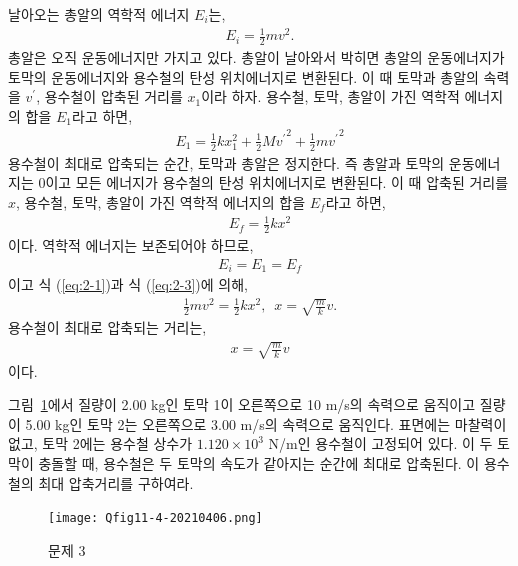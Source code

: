 \documentclass[floatfix,nofootinbib,superscriptaddress,fleqn]{revtex4-2}
\begin{document}
날아오는 총알의 역학적 에너지 $E_i$는,
\begin{align}\label{eq:2-1}
  E_i = \frac{1}{2}mv^2.
\end{align}
총알은 오직 운동에너지만 가지고 있다. 총알이 날아와서 박히면 총알의 
운동에너지가 토막의 운동에너지와 용수철의 탄성 위치에너지로 변환된다.
이 때 토막과 총알의 속력을 $v^\prime$, 용수철이 압축된 거리를 $x_1$이라 하자.
용수철, 토막, 총알이 가진 역학적 에너지의 합을 $E_1$라고 하면,
\begin{align}
E_1=\frac{1}{2}kx_1^2+\frac{1}{2}M{v^\prime}^2+\frac{1}{2}m{v^\prime}^2
\end{align}
용수철이 최대로 압축되는 순간, 토막과 총알은 정지한다. 즉 총알과 토막의
운동에너지는 0이고 모든 에너지가 용수철의 탄성 위치에너지로 변환된다. 
이 때 압축된 거리를 $x$, 용수철, 토막, 총알이 가진 역학적 에너지의 합을 
$E_f$라고 하면,
\begin{align}\label{eq:2-3}
  E_f = \frac{1}{2}kx^2
\end{align}
이다. 역학적 에너지는 보존되어야 하므로,
\begin{align}
  E_i = E_1 = E_f
\end{align}
이고 식 (\ref{eq:2-1})과 식 (\ref{eq:2-3})에 의해,
\begin{align}
  \frac{1}{2}mv^2=\frac{1}{2}kx^2,\,\,\,x=\sqrt{\frac{m}{k}}v.
\end{align}
용수철이 최대로 압축되는 거리는,
\begin{align}
  x=\sqrt{\frac{m}{k}}v
\end{align}
이다.
\vspace{1cm}

그림~\ref{fig:3}에서 질량이 2.00 kg인 토막 1이 오른쪽으로 10 m/s의
속력으로 움직이고 질량이 5.00 kg인 토막 2는 오른쪽으로 3.00 m/s의
속력으로 움직인다. 표면에는 마찰력이 없고, 토막 2에는 용수철 상수가
$1.120\times 10^3$ N/m인 용수철이 고정되어 있다. 이 두 토막이 충돌할
때, 용수철은 두 토막의 속도가 같아지는 순간에 최대로
압축된다. 이 용수철의 최대 압축거리를 구하여라. 
\begin{figure}[ht]
  \centering
  \texttt{[image: Qfig11-4-20210406.png]}
  \caption{문제 3}
  \label{fig:3}
\end{figure}
\end{document}
